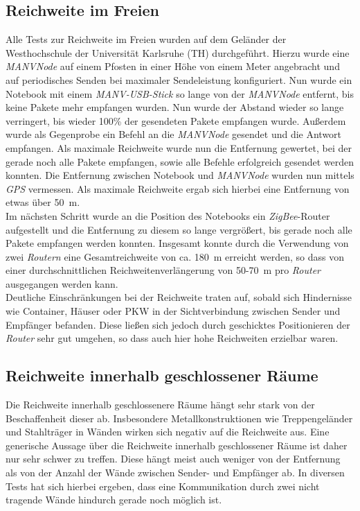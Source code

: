 \subsection{Reichweite im Freien}
Alle Tests zur Reichweite im Freien wurden auf dem Geländer der Westhochschule der Universität Karlsruhe (TH)
durchgeführt. Hierzu wurde eine \emph{MANVNode} auf einem Pfosten in einer Höhe von einem Meter angebracht
und auf periodisches Senden bei maximaler Sendeleistung konfiguriert.  Nun wurde ein Notebook mit einem 
\emph{MANV-USB-Stick} so lange von der \emph{MANVNode} entfernt, bis keine Pakete mehr empfangen wurden.
Nun wurde der Abstand wieder so lange verringert, bis wieder 100\% der gesendeten Pakete empfangen wurde.
Außerdem wurde als Gegenprobe ein Befehl an die \emph{MANVNode} gesendet und die Antwort empfangen. 
Als maximale Reichweite wurde nun die Entfernung gewertet, bei der gerade noch alle Pakete empfangen, 
sowie alle Befehle erfolgreich gesendet werden konnten. Die Entfernung zwischen Notebook und 
\emph{MANVNode} wurden nun mittels \emph{GPS} vermessen. Als maximale Reichweite ergab sich hierbei eine Entfernung
von etwas über 50~m.\\
Im nächsten Schritt wurde an die Position des Notebooks ein \emph{ZigBee}-Router aufgestellt und die Entfernung zu
diesem so lange vergrößert, bis gerade noch alle Pakete empfangen werden konnten. Insgesamt konnte durch
die Verwendung von zwei \emph{Routern} eine Gesamtreichweite von ca. 180~m erreicht werden, so dass von einer 
durchschnittlichen Reichweitenverlängerung von 50-70~m pro \emph{Router} ausgegangen werden kann.\\
Deutliche Einschränkungen bei der Reichweite traten auf, sobald sich Hindernisse wie Container, Häuser oder 
PKW in der Sichtverbindung zwischen Sender und Empfänger befanden. Diese ließen sich jedoch durch geschicktes
Positionieren der \emph{Router} sehr gut umgehen, so dass auch hier hohe Reichweiten erzielbar waren. 

\subsection{Reichweite innerhalb geschlossener Räume}
Die Reichweite innerhalb geschlossenere Räume hängt sehr stark von der Beschaffenheit dieser ab. Insbesondere
Metallkonstruktionen wie Treppengeländer und Stahlträger in Wänden wirken sich negativ auf die
Reichweite aus. Eine generische Aussage über die Reichweite innerhalb geschlossener Räume ist daher nur 
sehr schwer zu treffen. Diese hängt meist auch weniger von der Entfernung als von der Anzahl der
Wände zwischen Sender- und Empfänger ab. In diversen Tests hat sich hierbei ergeben, dass eine
Kommunikation durch zwei nicht tragende Wände hindurch gerade noch möglich ist.

